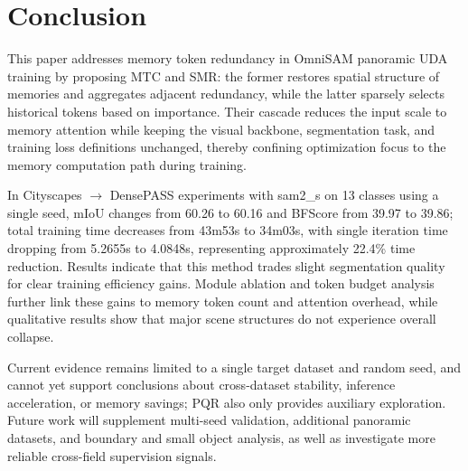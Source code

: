 \section{Conclusion}
\label{sec:conclusion}

This paper addresses memory token redundancy in OmniSAM panoramic UDA training by proposing MTC and SMR: the former restores spatial structure of memories and aggregates adjacent redundancy, while the latter sparsely selects historical tokens based on importance. Their cascade reduces the input scale to memory attention while keeping the visual backbone, segmentation task, and training loss definitions unchanged, thereby confining optimization focus to the memory computation path during training.

In Cityscapes $\rightarrow$ DensePASS experiments with sam2\_s on 13 classes using a single seed, mIoU changes from 60.26 to 60.16 and BFScore from 39.97 to 39.86; total training time decreases from 43m53s to 34m03s, with single iteration time dropping from 5.2655s to 4.0848s, representing approximately 22.4\% time reduction. Results indicate that this method trades slight segmentation quality for clear training efficiency gains. Module ablation and token budget analysis further link these gains to memory token count and attention overhead, while qualitative results show that major scene structures do not experience overall collapse.

Current evidence remains limited to a single target dataset and random seed, and cannot yet support conclusions about cross-dataset stability, inference acceleration, or memory savings; PQR also only provides auxiliary exploration. Future work will supplement multi-seed validation, additional panoramic datasets, and boundary and small object analysis, as well as investigate more reliable cross-field supervision signals.
